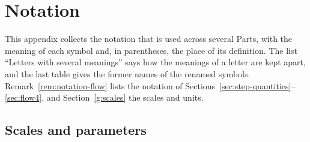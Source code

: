\section{Notation}\label{app:notation}

This appendix collects the notation that is used across several Parts, with the meaning of each symbol and, in parentheses, the place of its definition. The list ``Letters with several meanings'' says how the meanings of a letter are kept apart, and the last table gives the former names of the renamed symbols. Remark~\ref{rem:notation-flow} lists the notation of Sections~\ref{sec:step-quantities}--\ref{sec:flow4}, and Section~\ref{g:scales} the scales and units.

\subsection*{Scales and parameters}

